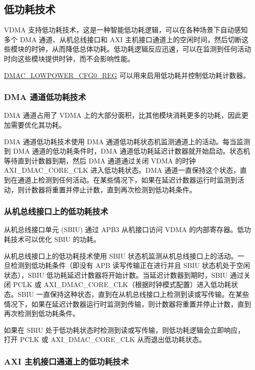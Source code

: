 \documentclass[main\_\_CN.tex]{subfiles}
\begin{document}
\subsection{低功耗技术}

VDMA 支持低功耗技术，这是一种智能低功耗逻辑，可以在各种场景下自动感知多个 DMA 通道、从机总线接口和 AXI 主机接口通道上的空闲时间，然后切断这些模块的时钟，从而降低总体功耗。低功耗逻辑反应迅速，可以在监测到任何活动时向这些模块提供时钟，而不会影响性能。

\hyperref[regdesc:DMACLOWPOWERCFG0REG]{DMAC\_LOWPOWER\_CFG0\_REG} 可以用来启用低功耗并控制低功耗计数器。

\subsubsection{DMA 通道低功耗技术}

DMA 通道占用了 VDMA 上的大部分面积，比其他模块消耗更多的功耗，因此更加需要优化其功耗。

DMA 通道低功耗技术使用 DMA 通道低功耗状态机监测通道上的活动。每当监测到 DMA 通道的低功耗条件时，DMA 通道低功耗延迟计数器就开始启动。状态机等待直到计数器到期，然后 DMA 通道通过关闭 VDMA 的时钟 AXI\_DMAC\_CORE\_CLK 进入低功耗状态。DMA 通道一直保持这个状态，直到在通道上检测到任何活动。在某些情况下，如果在延迟计数器运行时监测到活动，则计数器将重置并停止计数，直到再次检测到低功耗条件。
\subsubsection{从机总线接口上的低功耗技术}

从机总线接口单元 (SBIU) 通过 APB3 从机接口访问 VDMA 的内部寄存器。低功耗技术可以优化 SBIU 的功耗。

从机总线接口上的低功耗技术使用 SBIU 状态机监测从机总线接口上的活动。一旦检测到低功耗条件（即没有 APB 读写传输正在进行并且 SBIU 状态机处于空闲状态），SBIU 低功耗延迟计数器将开始计数。当延迟计数器到期时，SBIU 通过关闭 PCLK 或 AXI\_DMAC\_CORE\_CLK（根据时钟模式配置）进入低功耗状态。SBIU 一直保持这种状态，直到在从机总线接口上检测到读或写传输。在某些情况下，如果在延迟计数器运行时监测到传输，则计数器将重置并停止计数，直到再次检测到低功耗条件。

如果在 SBIU 处于低功耗状态时检测到读或写传输，则低功耗逻辑会立即响应，打开 PCLK 或 AXI\_DMAC\_CORE\_CLK 从而退出低功耗状态。

\subsubsection{AXI 主机接口通道上的低功耗技术}
\end{document}
